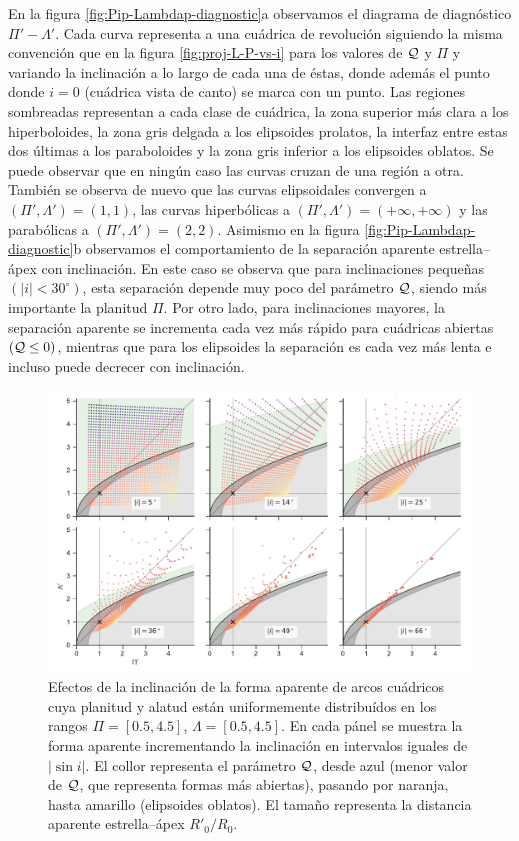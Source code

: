 En la figura \ref{fig:Pip-Lambdap-diagnostic}a observamos el diagrama de diagnóstico $\Pi'-\Lambda'$. Cada curva representa a una cuádrica de revolución siguiendo la misma convención que en la figura \ref{fig:proj-L-P-vs-i} para los valores de $\mathcal{Q}$ y $\Pi$ y variando la inclinación a lo largo de cada una de éstas, donde además el punto donde $i=0$ (cuádrica vista de canto) se marca con un punto. Las regiones sombreadas representan a cada clase de cuádrica, la zona superior más clara a los hiperboloides, la zona gris delgada a los elipsoides prolatos, la interfaz entre estas dos últimas a los paraboloides y la zona gris inferior a los elipsoides oblatos. Se puede observar que en ningún caso las curvas cruzan de una región a otra. También se observa de nuevo que las curvas elipsoidales convergen a $(\Pi', \Lambda') = (1, 1)$, las curvas hiperbólicas a $(\Pi', \Lambda') = (+\infty, +\infty)$ y las parabólicas a $(\Pi', \Lambda') = (2, 2)$. Asimismo en la figura \ref{fig:Pip-Lambdap-diagnostic}b observamos el comportamiento de la separación aparente estrella--ápex con inclinación. En este caso se observa que para inclinaciones pequeñas $(|i| < 30^\circ)$, esta separación depende muy poco del parámetro $\mathcal{Q}$, siendo más importante la planitud $\Pi$. Por otro lado, para inclinaciones mayores, la separación aparente se incrementa cada vez más rápido para cuádricas abiertas $(\mathcal{Q} \leq 0)$, mientras que para los elipsoides la separación es cada vez más lenta e incluso puede decrecer con inclinación.

\begin{figure}
  \centering
  \includegraphics[width=\linewidth]{./Figures/projected-R90-Rc-snapshots}
  \caption[Efectos de la inclinación de la forma aparente de arcos cuádricos]{Efectos de la inclinación de la forma aparente de arcos cuádricos cuya planitud y alatud están uniformemente distribuídos en los rangos $\Pi = [0.5, 4.5]$, $\Lambda = [0.5, 4.5]$. En cada pánel se muestra la forma aparente incrementando la inclinación en intervalos iguales de $|\sin i|$. El collor representa el parámetro $\mathcal{Q}$, desde azul (menor valor de $\mathcal{Q}$, que representa formas más abiertas), pasando por naranja, hasta amarillo (elipsoides oblatos). El tamaño representa la distancia aparente estrella--ápex $R'_0/R_0$.}
  \label{fig:snapshots}
\end{figure}


